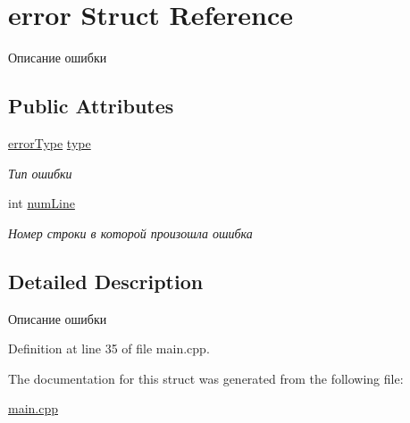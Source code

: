 \hypertarget{structerror}{}\section{error Struct Reference}
\label{structerror}


Описание ошибки  


\subsection*{Public Attributes}
\begin{DoxyCompactItemize}
\item 
\mbox{\label{structerror_a748420a8848495691444ba2ddaf5c2d7}} 
\hyperlink{main_8cpp_a0455f547a8d97c35c868b184e0c92ffd}{error\+Type} \hyperlink{structerror_a748420a8848495691444ba2ddaf5c2d7}{type}
\begin{DoxyCompactList}\small\item\em Тип ошибки \end{DoxyCompactList}\item 
\mbox{\label{structerror_a71b47c914955f43502084a24dabba233}} 
int \hyperlink{structerror_a71b47c914955f43502084a24dabba233}{num\+Line}
\begin{DoxyCompactList}\small\item\em Номер строки в которой произошла ошибка \end{DoxyCompactList}\end{DoxyCompactItemize}


\subsection{Detailed Description}
Описание ошибки 

Definition at line 35 of file main.\+cpp.



The documentation for this struct was generated from the following file\+:\begin{DoxyCompactItemize}
\item 
\hyperlink{main_8cpp}{main.\+cpp}\end{DoxyCompactItemize}
